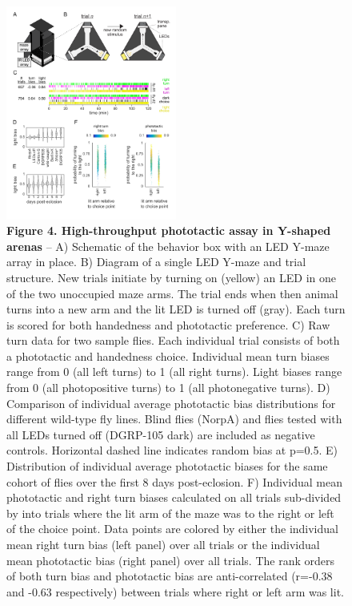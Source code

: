 \documentclass[10pt]{article}
\begin{document}
\clearpage
\begin{figure}[t!]
	\begin{center}
		\includegraphics[width=0.5\textwidth]{../figures/LED_ymaze_panel_sm.pdf}
	\end{center}
	\caption*{\footnotesize \textbf{Figure 4. High-throughput phototactic assay in Y-shaped arenas} -- A) Schematic of the behavior box with an LED Y-maze array in place. B) Diagram of a single LED Y-maze and trial structure. New trials initiate by turning on (yellow) an LED in one of the two unoccupied maze arms. The trial ends when then animal turns into a new arm and the lit LED is turned off (gray). Each turn is scored for both handedness and phototactic preference. C) Raw turn data for two sample flies. Each individual trial consists of both a phototactic and handedness choice. Individual mean turn biases range from 0 (all left turns) to 1 (all right turns). Light biases range from 0 (all photopositive turns) to 1 (all photonegative turns). D) Comparison of individual average phototactic bias distributions for different wild-type fly lines. Blind flies (NorpA) and flies tested with all LEDs turned off (DGRP-105 dark) are included as negative controls. Horizontal dashed line indicates random bias at p=0.5. E) Distribution of individual average phototactic biases for the same cohort of flies over the first 8 days post-eclosion. F) Individual mean phototactic and right turn biases calculated on all trials sub-divided by into trials where the lit arm of the maze was to the right or left of the choice point. Data points are colored by either the individual mean right turn bias (left panel) over all trials or the individual mean phototactic bias (right panel) over all trials. The rank orders of both turn bias and phototactic bias are anti-correlated (r=-0.38 and -0.63  respectively) between trials where right or left arm was lit.}
\end{figure}
\end{document}
